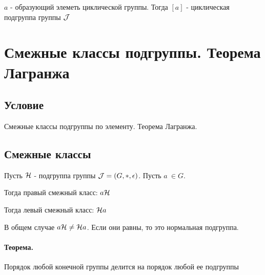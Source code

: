 \documentclass{report}
\begin{document}
$a$ - образующий элеметь циклической группы. Тогда\newline
$[a]$ - циклическая подгруппа группы $\cal J$
\newpage

\section{Смежные классы подгруппы. Теорема Лагранжа}
\subsection{Условие}
Смежные классы подгруппы по элементу. Теорема Лагранжа.

\subsection{Смежные классы}
Пусть $\cal H$ - подгруппа группы ${\cal J} = (G, *, \epsilon)$. Пусть $a\ \in G$.

Тогда правый смежный класс: $a\cal H$

Тогда левый смежный класс: ${\cal H}a$

В общем случае $a{\cal H} \neq {\cal H}a$. Если они равны, то это нормальная подгруппа.

\paragraph*{Теорема.}
Порядок любой конечной группы делится на порядок любой ее подгруппы
\end{document}
